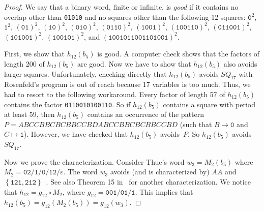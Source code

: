 \documentclass{article}
\def\acc#1{\left\{ #1 \right\}}
\theoremstyle{plain}
\theoremstyle{definition}
\theoremstyle{remark}
\begin{document}
\begin{proof}
We say that a binary word, finite or infinite, is \emph{good} if it contains no overlap
other than \texttt{01010} and no squares other than the following 12 squares:
$\texttt{0}^2$, $\texttt{1}^2$, $(\texttt{01})^2$, $(\texttt{10})^2$, $(\texttt{010})^2$,
$(\texttt{0110})^2$, $(\texttt{1001})^2$, $(\texttt{100110})^2$, $(\texttt{011001})^2$,
$(\texttt{101001})^2$, $(\texttt{100101})^2$, and $(\texttt{1001011001101001})^2$.

First, we show that $h_{12}(b_5)$ is good.
A computer check shows that the factors of length 200 of $h_{12}(b_5)$ are good.
Now we have to show that $h_{12}(b_5)$ also avoids larger squares.
Unfortunately, checking directly that $h_{12}(b_5)$ avoids $SQ_{17}$ with Rosenfeld's program
is out of reach because 17 variables is too much. Thus, we had to resort to the following workaround.
Every factor of length 57 of $h_{12}(b_5)$ contains the factor \texttt{0110010100110}.
So if $h_{12}(b_5)$ contains a square with period at least 59, then $h_{12}(b_5)$ contains an occurrence
of the pattern $P=ABCCBBCBCBBCCBDABCCBBCBCBBCCBD$ (such that $B\mapsto\texttt{0}$ and $C\mapsto\texttt{1}$).
However, we have checked that $h_{12}(b_5)$ avoids~$P$. So $h_{12}(b_5)$ avoids $SQ_{17}$.

Now we prove the characterization. Consider Thue's word $w_3=M_2(b_5)$ where
$M_2=\texttt{02}/\texttt{1}/\texttt{0}/\texttt{12}/\varepsilon$.
The word $w_3$ avoids (and is characterized by) $AA$ and $\acc{\texttt{121},\texttt{212}}$~\cite{BO15}.
See also Theorem 15 in~\cite{OchemRosenfeld2021} for another characterization.
We notice that $h_{12}=g_{12}\circ M_2$, where $g_{12}=\texttt{001}/\texttt{01}/\texttt{1}$.
This implies that $h_{12}(b_5)=g_{12}(M_2(b_5))=g_{12}(w_3)$.


\end{proof}
\end{document}

